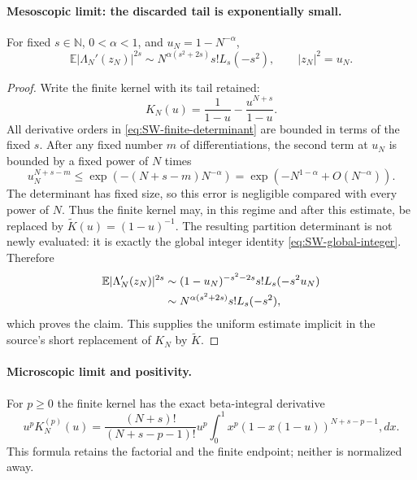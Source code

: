 \paragraph{Mesoscopic limit: the discarded tail is exponentially small.}

\begin{theorem}
\label{thm:SW-mesoscopic}
For fixed $s\in\mathbb N$, $0<\alpha<1$, and $u_N=1-N^{-\alpha}$,
\begin{equation}
 \mathbb E|\Lambda_N'(z_N)|^{2s}
 \sim N^{\alpha(s^2+2s)}s!L_s(-s^2),
 \qquad |z_N|^2=u_N.
 \label{eq:SW-mesoscopic}
\end{equation}
\end{theorem}

\begin{proof}
Write the finite kernel with its tail retained:
\begin{equation}
 K_N(u)=\frac1{1-u}-\frac{u^{N+s}}{1-u}.
 \label{eq:SW-kernel-tail}
\end{equation}
All derivative orders in \eqref{eq:SW-finite-determinant} are bounded in terms of the fixed
$s$.  After any fixed number $m$ of differentiations, the second term at $u_N$ is bounded by
a fixed power of $N$ times
\begin{equation}
 u_N^{N+s-m}\leq\exp(-(N+s-m)N^{-\alpha})
 =\exp(-N^{1-\alpha}+O(N^{-\alpha})).
 \label{eq:SW-tail-exponential}
\end{equation}
The determinant has fixed size, so this error is negligible compared with every power of
$N$.  Thus the finite kernel may, in this regime and after this estimate, be replaced by
$\widetilde K(u)=(1-u)^{-1}$.  The resulting partition determinant is not newly evaluated:
it is exactly the global integer identity \eqref{eq:SW-global-integer}.  Therefore
\begin{align}
 \mathbb E|\Lambda_N'(z_N)|^{2s}
 &\sim(1-u_N)^{-s^2-2s}s!L_s(-s^2u_N)\notag\\
 &\sim N^{\alpha(s^2+2s)}s!L_s(-s^2),
\end{align}
which proves the claim.  This supplies the uniform estimate implicit in the source's short
replacement of $K_N$ by $\widetilde K$.
\end{proof}

\paragraph{Microscopic limit and positivity.}
For $p\geq0$ the finite kernel has the exact beta-integral derivative
\begin{equation}
 u^pK_N^{(p)}(u)
 =\frac{(N+s)!}{(N+s-p-1)!}u^p
 \int_0^1x^p(1-x(1-u))^{N+s-p-1},dx.
 \label{eq:SW-beta-kernel}
\end{equation}
This formula retains the factorial and the finite endpoint; neither is normalized away.

